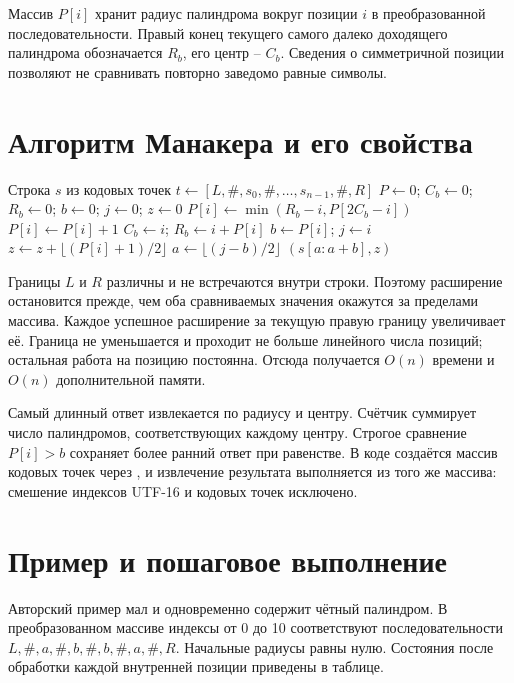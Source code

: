 Массив $P[i]$ хранит радиус палиндрома вокруг позиции $i$ в преобразованной последовательности. Правый конец текущего самого далеко доходящего палиндрома обозначается $R_b$, его центр -- $C_b$. Сведения о симметричной позиции позволяют не сравнивать повторно заведомо равные символы.

\section{Алгоритм Манакера и его свойства}
\begin{algorithm}[H]
\small{}
\caption{Поиск самого длинного палиндрома и числа вхождений}
\begin{algorithmic}[1]
\Require Строка $s$ из кодовых точек
\State $t\gets [L,\#,s_0,\#,\ldots,s_{n-1},\#,R]$
\State $P\gets 0$; $C_b\gets0$; $R_b\gets0$; $b\gets0$; $j\gets0$; $z\gets0$
    \State $P[i]\gets\min(R_b-i,P[2C_b-i])$
  \EndIf
    \State $P[i]\gets P[i]+1$
  \EndWhile
    \State $C_b\gets i$; $R_b\gets i+P[i]$
  \EndIf
    \State $b\gets P[i]$; $j\gets i$
  \EndIf
  \State $z\gets z+\lfloor(P[i]+1)/2\rfloor$
\EndFor
\State $a\gets\lfloor(j-b)/2\rfloor$
\State \Return $(s[a:a+b],z)$
\end{algorithmic}
\end{algorithm}

Границы $L$ и $R$ различны и не встречаются внутри строки. Поэтому расширение остановится прежде, чем оба сравниваемых значения окажутся за пределами массива. Каждое успешное расширение за текущую правую границу увеличивает её. Граница не уменьшается и проходит не больше линейного числа позиций; остальная работа на позицию постоянна. Отсюда получается $O(n)$ времени и $O(n)$ дополнительной памяти.

Самый длинный ответ извлекается по радиусу и центру. Счётчик суммирует число палиндромов, соответствующих каждому центру. Строгое сравнение $P[i]>b$ сохраняет более ранний ответ при равенстве. В коде создаётся массив кодовых точек через , и извлечение результата выполняется из того же массива: смешение индексов UTF-16 и кодовых точек исключено.

\section{Пример и пошаговое выполнение}
Авторский пример  мал и одновременно содержит чётный палиндром. В преобразованном массиве индексы от 0 до 10 соответствуют последовательности $L,\#,a,\#,b,\#,b,\#,a,\#,R$. Начальные радиусы равны нулю. Состояния после обработки каждой внутренней позиции приведены в таблице.

